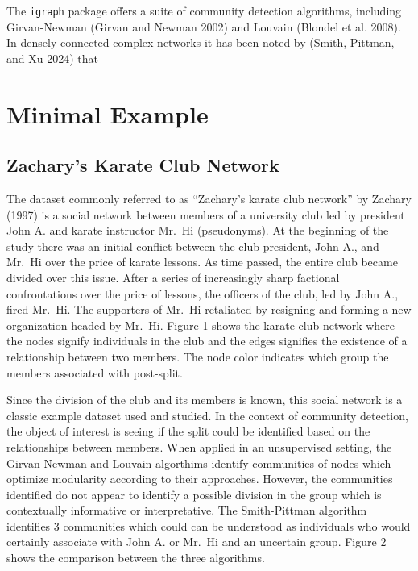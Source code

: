 \documentclass[10pt,a4paper,onecolumn]{article}
\begin{document}
The \texttt{igraph} package offers a suite of community detection
algorithms, including Girvan-Newman (Girvan and Newman 2002) and Louvain
(Blondel et al. 2008). In densely connected complex networks it has been
noted by (Smith, Pittman, and Xu 2024) that

\section{Minimal Example}\label{minimal-example}

\subsection{Zachary's Karate Club
Network}\label{zacharys-karate-club-network}

The dataset commonly referred to as ``Zachary's karate club network'' by
Zachary (1997) is a social network between members of a university club
led by president John A. and karate instructor Mr.~Hi (pseudonyms). At
the beginning of the study there was an initial conflict between the
club president, John A., and Mr.~Hi over the price of karate lessons. As
time passed, the entire club became divided over this issue. After a
series of increasingly sharp factional confrontations over the price of
lessons, the officers of the club, led by John A., fired Mr.~Hi. The
supporters of Mr.~Hi retaliated by resigning and forming a new
organization headed by Mr.~Hi. Figure 1 shows the karate club network
where the nodes signify individuals in the club and the edges signifies
the existence of a relationship between two members. The node color
indicates which group the members associated with post-split.

Since the division of the club and its members is known, this social
network is a classic example dataset used and studied. In the context of
community detection, the object of interest is seeing if the split could
be identified based on the relationships between members. When applied
in an unsupervised setting, the Girvan-Newman and Louvain algorthims
identify communities of nodes which optimize modularity according to
their approaches. However, the communities identified do not appear to
identify a possible division in the group which is contextually
informative or interpretative. The Smith-Pittman algorithm identifies 3
communities which could can be understood as individuals who would
certainly associate with John A. or Mr.~Hi and an uncertain group.
Figure 2 shows the comparison between the three algorithms.
\end{document}
